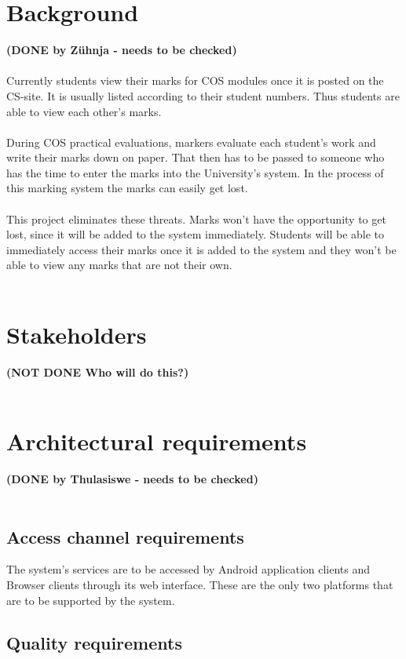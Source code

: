 \documentclass[11pt,a4paper]{article}
\begin{document}
\section{Background}
\textbf{(DONE by Z\"uhnja - needs to be checked)}\\ \\
Currently students view their marks for COS modules once it is posted on the CS-site.  It is usually listed according to their student numbers.  Thus students are able to view each other\textquoteright s marks.  \\ \\
During COS practical evaluations, markers evaluate each student\textquoteright s work and write their marks down on paper.  That then has to be passed to someone who has the time to enter the marks into the University\textquoteright s system.  In the process of this marking system the marks can easily get lost. \\ \\
This project eliminates these threats.  Marks won\textquoteright t have the opportunity to get lost, since it will be added to the system immediately. Students will be able to immediately access their marks once it is added to the system and they won\textquoteright t be able to view any marks that are not their own.  \\ \\

\section{Stakeholders}
\textbf{(NOT DONE Who will do this?)}\\ \\
\section{Architectural requirements}
\textbf{(DONE by Thulasiswe - needs to be checked)}\\ \\
\subsection{Access channel requirements}
The system's services are to be accessed by Android application clients and Browser clients through its web interface. These are the only two platforms that are to be supported by the system.
\subsection{Quality requirements}
\end{document}
